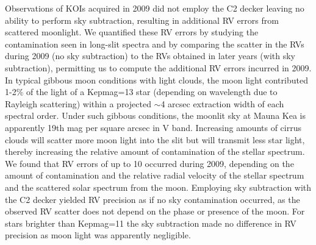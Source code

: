 \documentclass{emulateapj}
\begin{document}
Observations of KOIs acquired in 2009 did not employ the C2 decker
 leaving no ability to perform sky subtraction, resulting in
 additional RV errors from scattered moonlight.  We quantified these
 RV errors by studying the contamination seen in long-slit spectra and
 by comparing the scatter in the RVs during 2009 (no sky subtraction)
 to the RVs obtained in later years (with sky subtraction), permitting
 us to compute the additional RV errors incurred in 2009.  In typical
 gibbous moon conditions with light clouds, the moon light contributed
 1-2\% of the light of a Kepmag=13 star (depending on wavelength due
 to Rayleigh scattering) within a projected $\sim$4 arcsec extraction
 width of each spectral order.  Under such gibbous conditions, the
 moonlit sky at Mauna Kea is apparently 19th mag per square arcsec in
 V band.  Increasing amounts of cirrus clouds will scatter more moon
 light into the slit but will transmit less star light, thereby
 increasing the relative amount of contamination of the stellar
 spectrum.  We found that RV errors of up to 10 \ms occurred during
 2009, depending on the amount of contamination and the relative
 radial velocity of the stellar spectrum and the scattered solar
 spectrum from the moon.  Employing sky subtraction with the C2 decker yielded RV
 precision as if no sky contamination occurred, as the observed RV
 scatter does not depend on the phase or presence of the moon.  For
 stars brighter than Kepmag=11 the sky subtraction made no difference
 in RV precision as moon light was apparently negligible.
\end{document}
